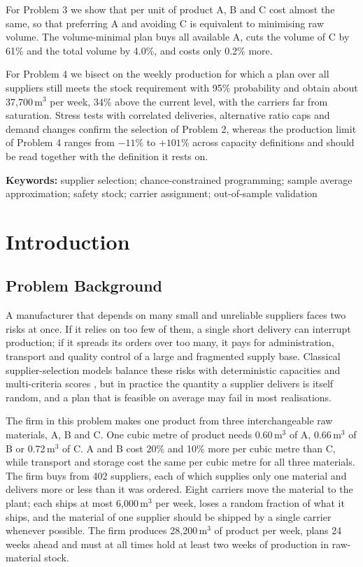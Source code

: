 \documentclass[11pt,a4paper]{article}
\begin{document}
For Problem 3 we show that per unit of product A, B and C cost almost the same, so that preferring A and avoiding C is equivalent to minimising raw volume.
The volume-minimal plan buys all available A, cuts the volume of C by 61\% and the total volume by 4.0\%, and costs only 0.2\% more.

For Problem 4 we bisect on the weekly production for which a plan over all suppliers still meets the stock requirement with 95\% probability and obtain about 37{,}700\,m$^3$ per week, 34\% above the current level, with the carriers far from saturation.
Stress tests with correlated deliveries, alternative ratio caps and demand changes confirm the selection of Problem 2, whereas the production limit of Problem 4 ranges from $-11\%$ to $+101\%$ across capacity definitions and should be read together with the definition it rests on.

\medskip
\noindent\textbf{Keywords:} supplier selection; chance-constrained programming; sample average approximation; safety stock; carrier assignment; out-of-sample validation

\newpage
\begingroup
\small
\setlength{\parskip}{0pt}
\tableofcontents
\endgroup
\newpage

\section{Introduction}

\subsection{Problem Background}
A manufacturer that depends on many small and unreliable suppliers faces two risks at once.
If it relies on too few of them, a single short delivery can interrupt production; if it spreads its orders over too many, it pays for administration, transport and quality control of a large and fragmented supply base.
Classical supplier-selection models balance these risks with deterministic capacities and multi-criteria scores \citep{aissaoui2007,ho2010}, but in practice the quantity a supplier delivers is itself random, and a plan that is feasible on average may fail in most realisations.

The firm in this problem makes one product from three interchangeable raw materials, A, B and C.
One cubic metre of product needs 0.60\,m$^3$ of A, 0.66\,m$^3$ of B or 0.72\,m$^3$ of C.
A and B cost 20\% and 10\% more per cubic metre than C, while transport and storage cost the same per cubic metre for all three materials.
The firm buys from 402 suppliers, each of which supplies only one material and delivers more or less than it was ordered.
Eight carriers move the material to the plant; each ships at most 6{,}000\,m$^3$ per week, loses a random fraction of what it ships, and the material of one supplier should be shipped by a single carrier whenever possible.
The firm produces 28{,}200\,m$^3$ of product per week, plans 24 weeks ahead and must at all times hold at least two weeks of production in raw-material stock.
\end{document}
